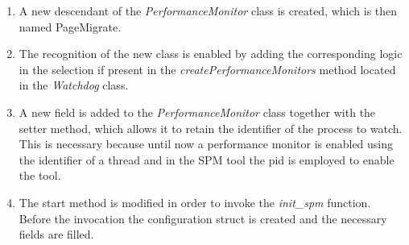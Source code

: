 \begin{enumerate}
	\item A new descendant of the \textit{PerformanceMonitor} class is created, which is then named PageMigrate.
	\item The recognition of the new class is enabled by adding the corresponding logic in the selection if present in the \textit{createPerformanceMonitors} method located in the \textit{Watchdog} class.
	\item A new field is added to the \textit{PerformanceMonitor} class together with the setter method, which allows it to retain the identifier of the process to watch. This is necessary because until now a performance monitor is enabled using the identifier of a thread and in the SPM tool the pid is employed to enable the tool.
	\item The start method is modified in order to invoke the \textit{init\_spm} function. Before the invocation the configuration struct is created and the necessary fields are filled.
\end{enumerate}
